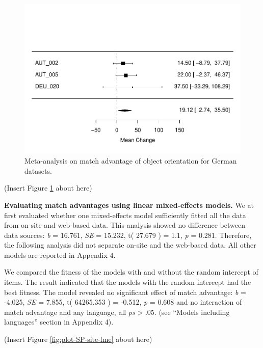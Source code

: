 \documentclass[
  man,floatsintext]{apa6}
\begin{document}
\begin{figure}
\centering
\includegraphics{Stage2_Report_0504_files/figure-latex/meta-ger-1.pdf}
\caption{\label{fig:meta-ger}Meta-analysis on match advantage of object orientation for German datasets.}
\end{figure}

(Insert Figure \ref{fig:meta-ger} about here)

\textbf{Evaluating match advantages using linear mixed-effects models.} We at first evaluated whether one mixed-effects model sufficiently fitted all the data from on-site and web-based data. This analysis showed no difference between data sources: \emph{b} = 16.761, \emph{SE} = 15.232, t( 27.679 ) = 1.1, \emph{p} = 0.281. Therefore, the following analysis did not separate on-site and the web-based data. All other models are reported in Appendix 4.

We compared the fitness of the models with and without the random intercept of items. The result indicated that the models with the random intercept had the best fitness. The model revealed no significant effect of match advantage: \emph{b} = -4.025, \emph{SE} = 7.855, t( 64265.353 ) = -0.512, \emph{p} = 0.608 and no interaction of match advantage and any language, all \emph{ps} \textgreater{} .05. (see ``Models including languages'' section in Appendix 4).

(Insert Figure \ref{fig:plot-SP-site-lme} about here)
\end{document}

